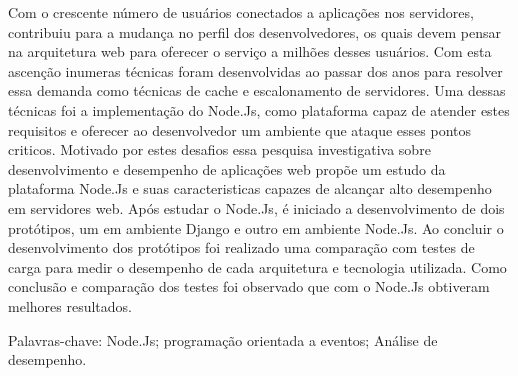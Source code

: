 \begin{resumo}
\vspace{-1cm}

\onehalfspacing

\noindent
  
  Com o crescente número de usuários conectados a aplicações nos servidores, contribuiu
  para  a mudança no perfil dos desenvolvedores, os quais devem pensar na arquitetura web 
  para oferecer o serviço a milhões desses usuários. Com esta ascenção inumeras técnicas foram desenvolvidas 
  ao passar dos anos para resolver essa demanda como técnicas de cache e escalonamento de servidores.
  Uma dessas técnicas foi a implementação do Node.Js, como plataforma capaz de atender estes requisitos
  e oferecer ao desenvolvedor um ambiente que ataque esses pontos criticos. Motivado por estes desafios
  essa pesquisa investigativa sobre desenvolvimento e desempenho de aplicações web propõe um estudo da plataforma
  Node.Js e suas caracteristicas capazes de alcançar alto desempenho em servidores web. Após estudar o Node.Js, 
  é iniciado a desenvolvimento de dois protótipos, um em ambiente Django e outro em ambiente Node.Js. Ao concluir o 
  desenvolvimento dos protótipos foi realizado uma comparação com testes
  de carga para medir o desempenho de cada arquitetura e tecnologia utilizada. Como conclusão e comparação dos testes 
  foi observado que com o Node.Js obtiveram melhores resultados. 
  

\vspace*{.75cm}

\noindent Palavras-chave: Node.Js; programação orientada a eventos; Análise de desempenho.\\

\end{resumo}